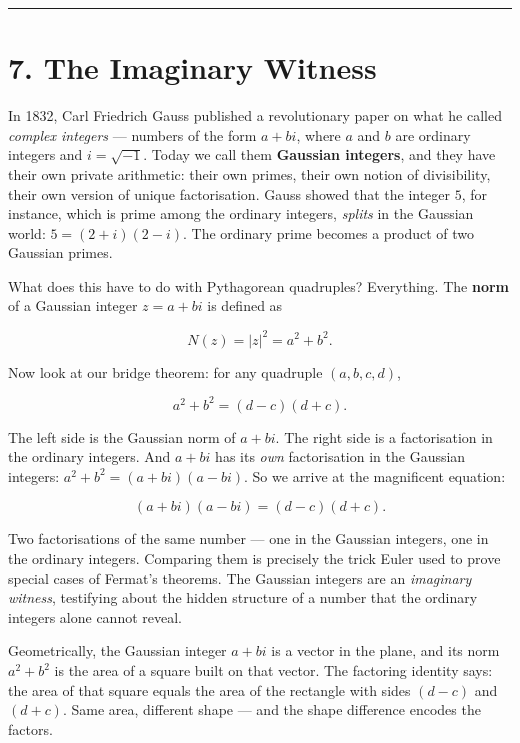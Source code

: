 \documentclass[11pt,openany]{book}
\theoremstyle{definition}
\theoremstyle{plain}
\theoremstyle{remark}
\begin{document}
\bigskip\noindent\rule{\textwidth}{0.4pt}\bigskip


\section{7. The Imaginary Witness}


In 1832, Carl Friedrich Gauss published a revolutionary paper on what he called \textit{complex integers} — numbers of the form $a + bi$, where $a$ and $b$ are ordinary integers and $i = \sqrt{-1}$. Today we call them \textbf{Gaussian integers}, and they have their own private arithmetic: their own primes, their own notion of divisibility, their own version of unique factorisation. Gauss showed that the integer $5$, for instance, which is prime among the ordinary integers, \textit{splits} in the Gaussian world: $5 = (2 + i)(2 - i)$. The ordinary prime becomes a product of two Gaussian primes.

What does this have to do with Pythagorean quadruples? Everything. The \textbf{norm} of a Gaussian integer $z = a + bi$ is defined as

$$N(z) = |z|^2 = a^2 + b^2.$$

Now look at our bridge theorem: for any quadruple $(a, b, c, d)$,

$$a^2 + b^2 = (d - c)(d + c).$$

The left side is the Gaussian norm of $a + bi$. The right side is a factorisation in the ordinary integers. And $a + bi$ has its \textit{own} factorisation in the Gaussian integers: $a^2 + b^2 = (a + bi)(a - bi)$. So we arrive at the magnificent equation:

$$(a + bi)(a - bi) = (d - c)(d + c).$$

Two factorisations of the same number — one in the Gaussian integers, one in the ordinary integers. Comparing them is precisely the trick Euler used to prove special cases of Fermat's theorems. The Gaussian integers are an \textit{imaginary witness}, testifying about the hidden structure of a number that the ordinary integers alone cannot reveal.

Geometrically, the Gaussian integer $a + bi$ is a vector in the plane, and its norm $a^2 + b^2$ is the area of a square built on that vector. The factoring identity says: the area of that square equals the area of the rectangle with sides $(d - c)$ and $(d + c)$. Same area, different shape — and the shape difference encodes the factors.
\end{document}

